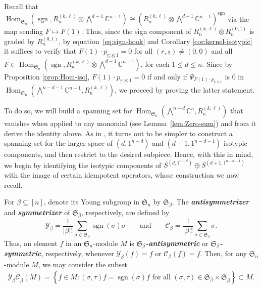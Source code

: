 \documentclass[11pt, reqno]{amsart}
\theoremstyle{definition}
\theoremstyle{remark}
\numberwithin{equation}{section}
\newcommand{\0}{\emptyset}
\newcommand{\C}{\mathbb{C}}
\renewcommand{\S}{\mathfrak{S}}
\newcommand{\cC}{\mathcal{C}}
\newcommand{\cY}{\mathcal{Y}}
\renewcommand{\r}{\underline{r}}
\newcommand{\s}{\underline{s}}
\DeclareMathOperator{\sgn}{sgn}
\DeclareMathOperator{\Hom}{Hom}
\newcommand{\newword}[1]{\emph{\textbf{#1}}}
\begin{document}
Recall that $\Hom_{\S_n}\left(\sgn, R_n^{(k,\ell)}\otimes \bigwedge^{d-1} \C^{n-1}\right) \cong \left(R_n^{(k,\ell)} \otimes \bigwedge^{d-1}\C^{n-1}\right)^{\sgn}$ via the map sending $F \mapsto F(1)$. Thus, since the sign component of $R_n^{(k,\ell)} \otimes R_n^{(0,1)}$ is graded by $R_n^{(0,1)}$, by equation~\eqref{eq:sign-hook} and Corollary \ref{cor:kernel-isotypic} it suffices to verify 
 that $F(1) \cdot p_{\r;\s;1} = 0$ for all $(\r,\s) \neq (\underline{0},\underline{0})$
 and all $F \in \Hom_{\S_n}\left(\sgn, R_n^{(k,\ell)}\otimes \bigwedge^{d-1} \C^{n-1}\right)$, for each $1\leq d \leq n$.
 Since by Proposition \ref{prop:Hom-iso}, $F(1) \cdot p_{\r;\s;1} = 0$ if and only if $\Psi_{F(1) \cdot p_{\r;\s;1}}$ is 0 in $\Hom_{\S_n}\left(\bigwedge^{n-d-1} \C^{n-1}, R_n^{(k,\ell)}\right)$, we proceed by proving the latter statement.

 To do so, we will build a spanning set for $\Hom_{\S_n}\left(\bigwedge^{n-d}\C^n, R_n^{(k,\ell)}\right)$ that vanishes when applied to any monomial (see Lemma~\ref{lem:Zero-sum}) and from it derive the identity above. 
 As in \cite{GLM}, it turns out to be simpler to construct a spanning set for the larger space of $(d,1^{n-d})$ and $(d+1,1^{n-d-1})$ isotypic components, and then restrict to the desired subpiece.
 Hence, with this in mind, we begin by identifying the isotypic components of $S^{(d,1^{n-d})} \oplus S^{(d+1,1^{n-d-1})}$ with the image of certain idempotent operators, whose construction we now recall.

For $\beta \subseteq [n]$, denote its Young subgroup in $\S_n$ by $\mathfrak{S}_\beta$. 
The \newword{antisymmetrizer} and 
\newword{symmetrizer} of $\mathfrak{S}_\beta$, respectively, are defined by 
\[
     \cY_\beta= \frac{1}{|\beta|!}\sum_{\sigma \in \mathfrak{S}_\beta} \sgn(\sigma) \sigma 
     \qquad \text{and} \qquad \cC_\beta= \frac{1}{|\beta|!}\sum_{\sigma \in \mathfrak{S}_\beta} \sigma. 
\]
Thus, an element  $f$ in an $\S_n$-module $M$ is \newword{$\S_\beta$-antisymmetric} or 
\newword{$\S_\beta$-symmetric}, respectively, whenever
$\cY_\beta(f) = f $ or $ \cC_\beta(f) = f.$
Then, for any $\S_n$-module $M$, we may consider the subset
\begin{align*}
    \cY_{\beta} \cC_{\overline{\beta}}(M)
    = 
    \left\{ f \in M : (\sigma,\tau)f = \sgn(\sigma) f 
    \text{ for all } 
    (\sigma,\tau) \in \S_{\beta} \times \S_{\overline{\beta}} \right\} 
    \subset M. 
\end{align*}
\end{document}
